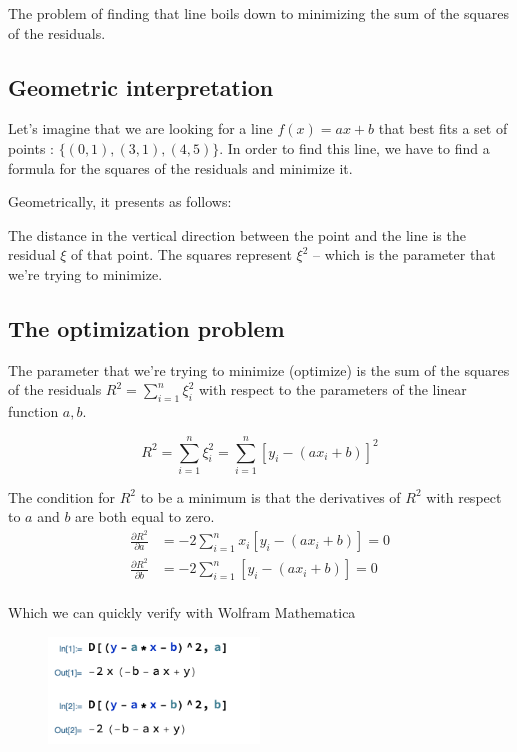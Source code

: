 \documentclass{MathematicaReport}
\begin{document}
The problem of finding that line boils down to minimizing the sum of the 
squares of the residuals.

\subsection{Geometric interpretation}
Let's imagine that we are looking for a line \( f(x) = ax + b \) that best fits 
a set of points : \( \{(0,1), (3,1), (4,5)\} \). In order to find this line,
we have to find a formula for the squares of the residuals and minimize it.

Geometrically, it presents as follows:
\begin{center}
	
\end{center}
The distance in the vertical direction between the point and the line is the 
residual \( \xi \) of that point. The squares represent \( \xi^2 \) -- which is
the parameter that we're trying to minimize.

\subsection{The optimization problem}
The parameter that we're trying to minimize (optimize) is the sum of the squares
of the residuals \( R^2 = \sum_{i=1}^{n} \xi_i^2 \) with respect to the parameters of 
the linear function \( a, b \).

\[
	R^2 = \sum_{i=1}^{n} \xi_i^2 = \sum_{i=1}^{n} \left[ y_i - (ax_i + b) \right]^2
\]

The condition for \( R^2 \) to be a minimum is that the derivatives of \( R^2 \)
with respect to \( a \) and \( b \) are both equal to zero.
\begin{equation*}
	\begin{aligned}
		\frac{\partial R^2}{\partial a} & = -2\sum_{i=1}^n x_i[y_i-(ax_i+b)] = 0 \\
		\frac{\partial R^2}{\partial b} & = -2\sum_{i=1}^n [y_i-(ax_i+b)] = 0 \\
	\end{aligned}
\end{equation*}

Which we can quickly verify with Wolfram Mathematica
\begin{figure}[H]
\centering
\includegraphics[width=0.5\textwidth]{images/least_squares_derivatives.png}
\end{figure}
\end{document}
